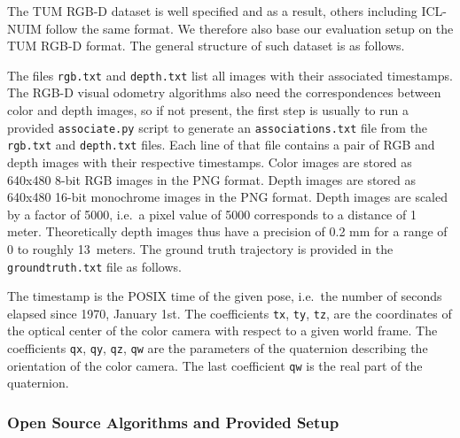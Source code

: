 The TUM RGB-D dataset is well specified and as a result,
others including ICL-NUIM follow the same format.
We therefore also base our evaluation setup on the TUM RGB-D format.
The general structure of such dataset is as follows.

The files \verb|rgb.txt| and \verb|depth.txt| list all images with their associated timestamps.
The RGB-D visual odometry algorithms also need the correspondences between color
and depth images, so if not present, the first step is usually to run
a provided \verb|associate.py| script to generate an \verb|associations.txt| file
from the \verb|rgb.txt| and \verb|depth.txt| files.
Each line of that file contains a pair of RGB and depth images with their respective timestamps.
Color images are stored as 640x480 8-bit RGB images in the PNG format.
Depth images are stored as 640x480 16-bit monochrome images in the PNG format.
Depth images are scaled by a factor of 5000, i.e.\ a pixel value of 5000 corresponds
to a distance of 1 meter.
Theoretically depth images thus have a precision of 0.2 mm for a range of
0 to roughly 13~meters.
The ground truth trajectory is provided in the \verb|groundtruth.txt| file as follows.

The timestamp is the POSIX time of the given pose,
i.e.\ the number of seconds elapsed since 1970, January 1st.
The coefficients \verb|tx|, \verb|ty|, \verb|tz|, are the coordinates
of the optical center of the color camera with respect to a given world frame.
The coefficients \verb|qx|, \verb|qy|, \verb|qz|, \verb|qw| are the parameters of the quaternion
describing the orientation of the color camera.
The last coefficient \verb|qw| is the real part of the quaternion.

\subsubsection{Open Source Algorithms and Provided Setup}%
\label{ssub:algorithms_and_setup}

